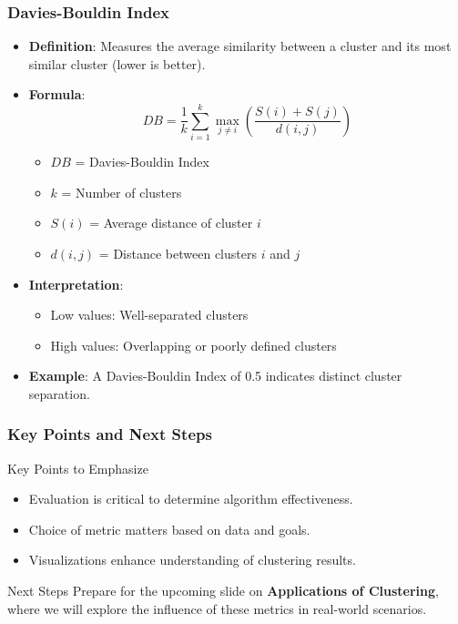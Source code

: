 \documentclass{beamer}
\begin{document}
\begin{frame}[fragile]
    \frametitle{Davies-Bouldin Index}
    \begin{itemize}
        \item \textbf{Definition}: Measures the average similarity between a cluster and its most similar cluster (lower is better).
        \item \textbf{Formula}:
        \begin{equation}
            DB = \frac{1}{k} \sum_{i=1}^{k} \max_{j \neq i} \left( \frac{S(i) + S(j)}{d(i, j)} \right)
        \end{equation}
        \begin{itemize}
            \item \( DB \) = Davies-Bouldin Index
            \item \( k \) = Number of clusters
            \item \( S(i) \) = Average distance of cluster \( i \)
            \item \( d(i, j) \) = Distance between clusters \( i \) and \( j \)
        \end{itemize}
        \item \textbf{Interpretation}:
        \begin{itemize}
            \item Low values: Well-separated clusters
            \item High values: Overlapping or poorly defined clusters
        \end{itemize}
        \item \textbf{Example}: A Davies-Bouldin Index of 0.5 indicates distinct cluster separation.
    \end{itemize}
\end{frame}

\begin{frame}[fragile]
    \frametitle{Key Points and Next Steps}
    \begin{block}{Key Points to Emphasize}
        \begin{itemize}
            \item Evaluation is critical to determine algorithm effectiveness.
            \item Choice of metric matters based on data and goals.
            \item Visualizations enhance understanding of clustering results.
        \end{itemize}
    \end{block}
    \begin{block}{Next Steps}
        Prepare for the upcoming slide on \textbf{Applications of Clustering}, where we will explore the influence of these metrics in real-world scenarios.
    \end{block}
\end{frame}
\end{document}
